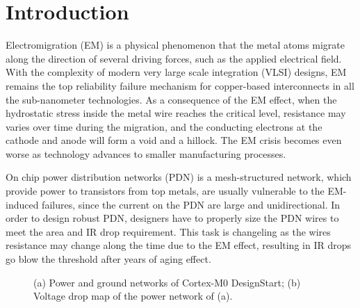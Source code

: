 \section{Introduction}
\label{sec:intro}
Electromigration (EM) is a physical phenomenon that the metal atoms migrate along the direction of several driving forces, such as the applied electrical field. 
With the complexity of modern very large scale integration (VLSI) designs, EM remains the top reliability failure mechanism for copper-based interconnects in all the sub-nanometer technologies.
As a consequence of the EM effect, when the hydrostatic stress inside the metal wire reaches the critical level, resistance may varies over time during the migration, and the conducting electrons at the cathode and anode will form a void and a hillock.
The EM crisis becomes even worse as technology advances to smaller manufacturing processes. 

On chip power distribution networks (PDN) is a mesh-structured network, which provide power to transistors from top metals, are usually vulnerable to the EM-induced failures, since the current on the PDN are large and unidirectional. In order to design robust PDN, designers have to properly size the PDN wires to meet the area and IR drop requirement. This task is changeling as the wires resistance may change along the time due to the EM effect, resulting in IR drops go blow the threshold after years of aging effect. 

\begin{figure}[htp]
	\centering
	\caption{(a) Power and ground networks of Cortex-M0 DesignStart; (b) Voltage drop map of the power network of (a).}
	\label{fig:pgimage}
\end{figure}


